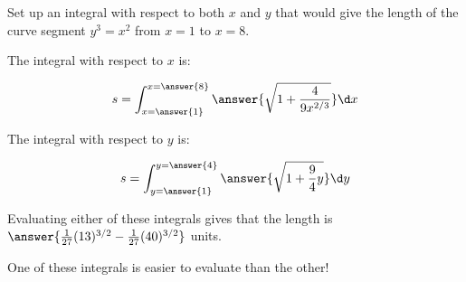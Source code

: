 \documentclass{ximera}
\author{Jim Talamo}
\begin{document}
\begin{exercise}

Set up an integral with respect to both $x$ and $y$ that would give the length of the curve segment $y^3=x^2$ from $x=1$ to $x=8$.

The integral with respect to $x$ is:

\[
s= \int_{x=\answer{1}}^{x=\answer{8}} \answer{\sqrt{1+\frac{4}{9x^{2/3}}}} \d x
\]

The integral with respect to $y$ is:

\[
s= \int_{y=\answer{1}}^{y=\answer{4}} \answer{\sqrt{1+\frac{9}{4}y}} \d y
\]

Evaluating either of these integrals gives that the length is $\answer{\frac{1}{27} (13)^{3/2} - \frac{1}{27} (40)^{3/2}}$ units.

\begin{remark}
One of these integrals is easier to evaluate than the other!
\end{remark}
\end{exercise}
\end{document}

